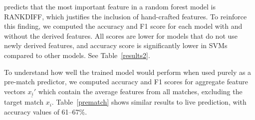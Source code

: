  predicts that the most important feature in a random forest model is  RANKDIFF, which justifies the inclusion of hand-crafted features. To reinforce this finding, we computed the accuracy and F1 score for each model with and without the derived features. All scores are lower for models that do not use newly derived features, and accuracy score is significantly lower in SVMs compared to other models. See Table~\ref{results2}.

To understand how well the trained model would perform when used purely as a pre-match predictor, we computed accuracy and F1 scores for aggregate feature vectors $\underline{x_i'}$ which contain the average features from all matches, excluding the target match $x_i$. Table~\ref{prematch} shows similar results to live prediction, with accuracy values of 61--67\%.
\begin{table}[t]
\caption{Pre-match prediction model performance}
\label{prematch}
\centering
\setlength{\tabcolsep}{10pt}
\end{table}